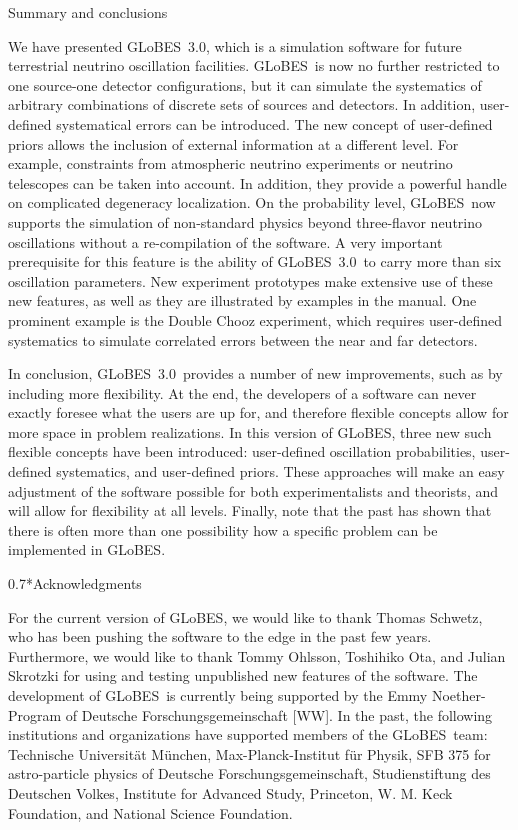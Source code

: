 \documentclass[12pt,a4paper]{article}
\makeatletter
\renewcommand{\section}{\@startsection{section}{1}{0em}{-\baselineskip}%
{\baselineskip}{\normalfont\large\bfseries}}
\renewcommand{\subsection}%
{\@startsection{subsection}{2}{0em}{-0.7\baselineskip}%
{0.7\baselineskip}{\normalfont\bfseries}}
\newcommand{\GLOBES}{{\sf GLoBES}}
\newcommand{\GLOBESN}{{\sf GLoBES~3.0}}
\makeatother
\begin{document}
\section{Summary and conclusions}

We have presented \GLOBESN , which is a simulation software for 
future terrestrial neutrino oscillation facilities. \GLOBES\ is now no further
restricted to one source-one detector configurations, but it can simulate
the systematics of arbitrary combinations of discrete sets of sources and
detectors. In addition, user-defined systematical errors can be introduced.
The new concept of user-defined priors allows the inclusion of external
information at a different level. For example, constraints from atmospheric
neutrino experiments or neutrino telescopes can be taken into account. In addition,
they provide a powerful handle on complicated degeneracy localization.
On the probability level, \GLOBES\ now supports the simulation of non-standard
physics beyond three-flavor neutrino oscillations without a re-compilation of
the software. A very important prerequisite for this feature is the ability
of \GLOBESN\ to carry more than six oscillation parameters. New experiment
prototypes make extensive use of these new features, as well as they are illustrated by
examples in the manual. One prominent example is the Double Chooz experiment,
which requires user-defined systematics to simulate correlated errors between
the near and far detectors.

In conclusion, \GLOBESN\ provides a number of new improvements, such as by
 including more flexibility. At the end, the developers of a software can never
exactly foresee what the users are up for, and therefore flexible concepts
allow for more space in problem realizations. In this version of \GLOBES ,
three new such flexible concepts have been introduced: user-defined oscillation 
probabilities, user-defined systematics, and user-defined priors. These approaches
will make an easy adjustment of the software possible for both experimentalists and theorists,
and will allow for flexibility at all levels.
Finally, note that the past has shown that there is often more than one possibility 
how a specific problem can be implemented in \GLOBES .

\subsection*{Acknowledgments}

For the current version of \GLOBES , we would like to 
thank Thomas Schwetz, who has been pushing the software to the edge in the 
past few years. Furthermore, we would like to thank Tommy Ohlsson,
Toshihiko Ota, and Julian Skrotzki for using and testing unpublished new features of the software.
%
The development of \GLOBES\ is currently being supported by the
Emmy Noether-Program of Deutsche Forschungsgemeinschaft [WW].
%
In the past, the following institutions and organizations have supported 
members of the \GLOBES\ team: Technische Universit\"at M\"unchen,
Max-Planck-Institut f\"ur Physik, SFB 375 for astro-particle physics
of Deutsche Forschungsgemeinschaft, Studienstiftung des Deutschen Volkes,
Institute for Advanced Study, Princeton, W. M. Keck Foundation, and National Science Foundation.



\end{document}
